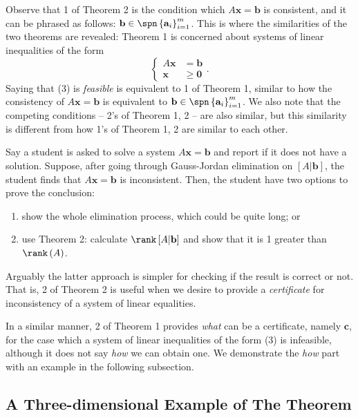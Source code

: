 \documentclass{article}
\renewcommand{\vec}{\mathbf}
\begin{document}
Observe that 1 of Theorem 2 is the condition which $A\vec{x}=\vec{b}$ is consistent, and it can be phrased as follows: $\vec{b}\in\spn\left\lbrace \vec{a}_i \right\rbrace ^{m}_{i=1}$. This is where the similarities of the two theorems are revealed: Theorem 1 is concerned about systems of linear inequalities of the form
\begin{equation}
    \begin{cases} 
        A\vec{x} & = \vec{b} \\
        \vec{x} & \geq \vec{0}
    \end{cases}.
\end{equation}
Saying that (3) is \textit{feasible} is equivalent to 1 of Theorem 1, similar to how the consistency of $A\vec{x}=\vec{b}$ is equivalent to $\vec{b}\in\spn\left\lbrace \vec{a}_i \right\rbrace ^{m}_{i=1}$. We also note that the competing conditions -- 2's of Theorem 1, 2 -- are also similar, but this similarity is different from how 1's of Theorem 1, 2 are similar to each other.

Say a student is asked to solve a system $A\vec{x}=\vec{b}$ and report if it does not have a solution. Suppose, after going through Gauss-Jordan elimination on $\left[ A|\vec{b} \right]$, the student finds that $A\vec{x}=\vec{b}$ is inconsistent. Then, the student have two options to prove the conclusion:
\begin{enumerate}
    \item show the whole elimination process, which could be quite long; or
    \item use Theorem 2: calculate $\rank\left[ A|\vec{b} \right]$ and show that it is 1 greater than $\rank\left( A \right)$.
\end{enumerate}
Arguably the latter approach is simpler for checking if the result is correct or not. That is, 2 of Theorem 2 is useful when we desire to provide a \textit{certificate} for inconsistency of a system of linear equalities.

In a similar manner, 2 of Theorem 1 provides \textit{what} can be a certificate, namely $\vec{c}$, for the case which a system of linear inequalities of the form (3) is infeasible, although it does not say \textit{how} we can obtain one. We demonstrate the \textit{how} part with an example in the following subsection.

\subsection{A Three-dimensional Example of The Theorem}
\end{document}
